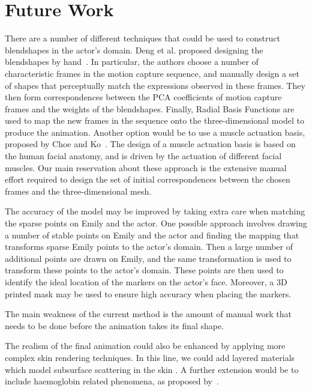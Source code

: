 

\section{Future Work}

There are a number of different techniques that could be used to construct blendshapes in the actor's domain. Deng et al. proposed designing the blendshapes by hand~\cite{Deng:2006}. In particular, the authors choose a number of characteristic frames in the motion capture sequence, and manually design a set of shapes that perceptually match the expressions observed in these frames. They then form correspondences between the PCA coefficients of motion capture frames and the weights of the blendshapes. Finally, Radial Basis Functions are used to map the new frames in the sequence onto the three-dimensional model to produce the animation. Another option would be to use a muscle actuation basis, proposed by Choe and Ko~\cite{Choe:2005}. The design of a muscle actuation basis is based on the human facial anatomy, and is driven by the actuation of different facial muscles. Our main reservation about these approach is the extensive manual effort required to design the set of initial correspondences between the chosen frames and the three-dimensional mesh.

The accuracy of the model may be improved by taking extra care when matching the sparse points on Emily and the actor. One possible approach involves drawing a number of stable points on Emily and the actor and finding the mapping that transforms sparse Emily points to the actor's domain. Then a large number of additional points are drawn on Emily, and the same transformation is used to transform these points to the actor's domain. These points are then used to identify the ideal location of the markers on the actor's face. Moreover, a 3D printed mask may be used to ensure high accuracy when placing the markers. %

The main weakness of the current method is the amount of manual work that needs to be done before the animation takes its final shape. 


The realism of the final animation could also be enhanced by applying more complex skin rendering techniques.
In this line, we could add layered materials which model subsurface scattering in the skin \cite{Weyrich2006}.
A further extension would be to include haemoglobin related phenomena, as proposed by~\cite{Donner2008, Jimenez2010}.


